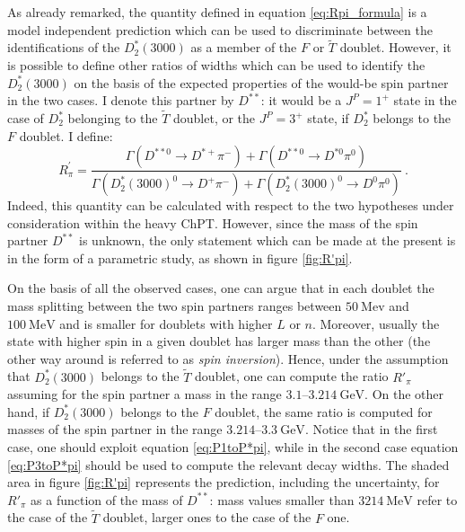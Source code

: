 As already remarked, the quantity defined in equation \eqref{eq:Rpi_formula} is a model independent prediction which can be used to discriminate between the identifications of the $D_2^*(3000)$ as a member of the $F$ or $\tilde{T}$ doublet. However, it is possible to define other ratios of widths which can be used to identify the $D_2^*(3000)$ on the basis of the expected properties of the would-be spin partner in the two cases. I denote this partner by $D^{**}$: it would be a $J^P=1^+$ state in the case of $D_2^*$ belonging to the ${\tilde T}$ doublet, or the $J^P=3^+$ state, if $D_2^*$ belongs to the $F $ doublet. I define:
\begin{equation}
R^\prime_\pi = \frac{\Gamma \left( D^{**0} \rightarrow D^{* +} \pi^- \right) + \Gamma \left( D^{**0} \rightarrow D^{* 0} \pi^0 \right)}{\Gamma \left( D_2^*(3000)^0 \rightarrow D^+ \pi^- \right) + \Gamma \left( D_2^*(3000)^0 \rightarrow D^0 \pi^0 \right)} \ .
\end{equation}
Indeed, this quantity can be calculated with respect to the two hypotheses under consideration within the heavy ChPT. However, since the mass of the spin partner $D^{**}$ is unknown, the only statement which can be made at the present is in the form of a parametric study, as shown in figure \ref{fig:R'pi}.

On the basis of all the observed cases, one can argue that in each doublet the mass splitting between the two spin partners ranges between $50 \ \text{Mev}$ and $100 \ \text{MeV}$ and is smaller for doublets with higher $L$ or $n$. Moreover, usually the state with higher spin in a given doublet has larger mass than the other (the other way around is referred to as \emph{spin inversion}). Hence, under the assumption that $D_2^*(3000)$ belongs to the $\tilde{T}$ doublet, one can compute the ratio $R'_\pi$ assuming for the spin partner a mass in the range $3.1 \text{--} 3.214 \ \text{GeV}$. On the other hand, if $D_2^*(3000)$ belongs to the $F$ doublet, the same ratio is computed for masses of the spin partner in the range $3.214 \text{--} 3.3 \ \text{GeV}$. Notice that in the first case, one should exploit equation \eqref{eq:P1toP*pi}, while in the second case equation \eqref{eq:P3toP*pi} should be used to compute the relevant decay widths. The shaded area in figure \ref{fig:R'pi} represents the prediction, including the uncertainty, for $R'_\pi$ as a function of the mass of $D^{**}$: mass values smaller than $3214 \ \text{MeV}$ refer to the case of the $\tilde{T}$ doublet, larger ones to the case of the $F$ one.

